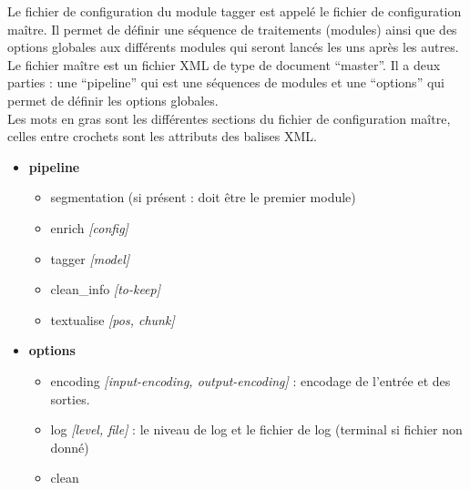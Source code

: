 \documentclass[manual-fr.tex]{subfiles}
\begin{document}
Le fichier de configuration du module tagger est appelé le fichier de configuration maître. Il permet de définir une séquence de traitements
(modules) ainsi que des options globales aux différents modules qui seront lancés les uns après les autres.\\

Le fichier maître est un fichier XML de type de document ``master''. Il a deux parties : une ``pipeline'' qui est une séquences de modules et
une ``options'' qui permet de définir les options globales.\\

Les mots en gras sont les différentes sections du fichier de configuration maître, celles entre crochets sont les attributs des balises XML.

\begin{itemize}
	\item[] \textbf{pipeline}
	\begin{itemize}
		\item[] segmentation (si présent : doit être le premier module)
		\item[] enrich \textit{[config]}
		\item[] tagger \textit{[model]}
		\item[] clean\_info \textit{[to-keep]}
		\item[] textualise \textit{[pos, chunk]}
	\end{itemize}
	\item[] \textbf{options}
	\begin{itemize}
		\item[] encoding \textit{[input-encoding, output-encoding]} : encodage de l'entrée et des sorties.
		\item[] log \textit{[level, file]} : le niveau de log et le fichier de log (terminal si fichier non donné)
		\item[] clean
	\end{itemize}
\end{itemize}
\end{document}
